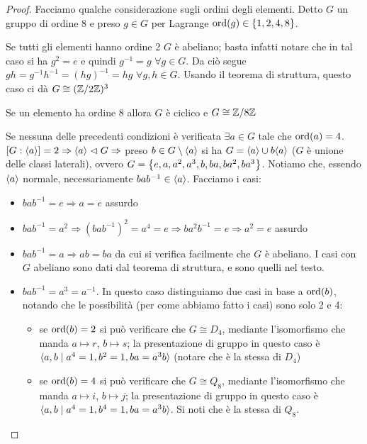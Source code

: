 \begin{proof}
    Facciamo qualche considerazione sugli ordini degli elementi. Detto $G$ un gruppo di ordine 8 e preso $g \in G$ per Lagrange $\text{ord}(g) \in \left\{ 1,2,4,8 \right\}$. 
    
    Se tutti gli elementi hanno ordine 2 $G$ è abeliano; basta infatti notare che in tal caso si ha $g^2 = e$ e quindi $g^{-1} = g$ $\forall g \in G$. Da ciò segue $gh = g^{-1}h^{-1} = (hg)^{-1} = hg$ $\forall g,h\in G$. Usando il teorema di struttura, questo caso ci dà $G \cong (\mathbb{Z}/2\mathbb{Z})^3$
    
    Se un elemento ha ordine 8 allora $G$ è ciclico e $G \cong \mathbb{Z}/8\mathbb{Z}$

    Se nessuna delle precedenti condizioni è verificata $\exists a \in G$ tale che $\text{ord}(a) = 4$. $[G : \langle a \rangle] = 2 \Rightarrow \langle a \rangle \vartriangleleft G \Rightarrow$ preso $b \in G \setminus \langle a \rangle$ si ha $G = \langle a \rangle \cup b\langle a \rangle$ ($G$ è unione delle classi laterali), ovvero $G = \left\{ e,a,a^2,a^3,b,ba,ba^2,ba^3 \right\}$. Notiamo che, essendo $\langle a \rangle$ normale, necessariamente $bab^{-1} \in \langle a \rangle$. Facciamo i casi:
    \begin{itemize}
        \item $bab^{-1} = e \Rightarrow a =e$ assurdo
        \item $bab^{-1} = a^2 \Rightarrow (bab^{-1})^2 = a^4 = e \Rightarrow ba^2b^{-1} = e \Rightarrow a^2 = e$ assurdo
        \item $bab^{-1} = a \Rightarrow ab = ba$ da cui si verifica facilmente che $G$ è abeliano. I casi con $G$ abeliano sono dati dal teorema di struttura, e sono quelli nel testo. 
        \item $bab^{-1} = a^3 = a^{-1}$. In questo caso distinguiamo due casi in base a $\text{ord}(b)$, notando che le possibilità (per come abbiamo fatto i casi) sono solo 2 e 4:
        \begin{itemize}
            \item se $\text{ord}(b) = 2$ si può verificare che $G \cong D_4$, mediante l'isomorfismo che manda $a \mapsto r$, $b \mapsto s$; la presentazione di gruppo in questo caso è $\langle a,b \mid a^4 = 1, b^2= 1, ba = a^3b \rangle$ (notare che è la stessa di $D_4$)
            \item se $\text{ord}(b) = 4$ si può verificare che $G \cong Q_8$, mediante l'isomorfismo che manda $a \mapsto i$, $b \mapsto j$; la presentazione di gruppo in questo caso è $\langle a,b \mid a^4 = 1, b^4= 1, ba = a^3b \rangle$. Si noti che è la stessa di $Q_8$.
        \end{itemize}
    \end{itemize}
\end{proof}

